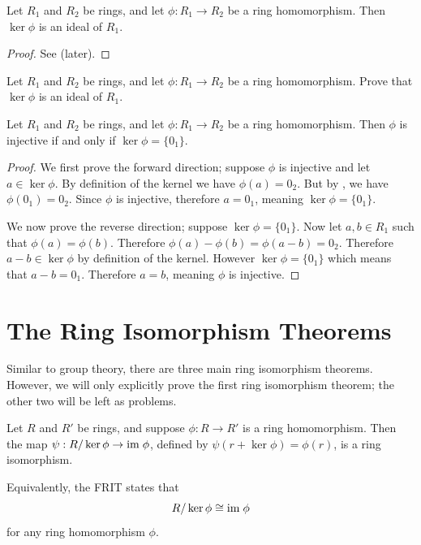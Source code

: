 \begin{proposition}
    Let $R_1$ and $R_2$ be rings, and let $\phi: R_1 \to R_2$ be a ring homomorphism. Then $\ker\phi$ is an ideal of $R_1$.
\end{proposition}
\begin{proof}
    See  (later).
\end{proof}
\begin{exercise}\label{exercise-kernel-is-an-ideal}
    Let $R_1$ and $R_2$ be rings, and let $\phi: R_1 \to R_2$ be a ring homomorphism. Prove that $\ker\phi$ is an ideal of $R_1$.
\end{exercise}

\begin{proposition}
    Let $R_1$ and $R_2$ be rings, and let $\phi: R_1 \to R_2$ be a ring homomorphism. Then $\phi$ is injective if and only if $\ker\phi = \{0_1\}$.
\end{proposition}
\begin{proof}
    We first prove the forward direction; suppose $\phi$ is injective and let $a \in \ker\phi$. By definition of the kernel we have $\phi(a) = 0_2$. But by , we have $\phi(0_1) = 0_2$. Since $\phi$ is injective, therefore $a = 0_1$, meaning $\ker\phi = \{0_1\}$.

    We now prove the reverse direction; suppose $\ker\phi = \{0_1\}$. Now let $a,b \in R_1$ such that $\phi(a) = \phi(b)$. Therefore $\phi(a) - \phi(b) = \phi(a-b) = 0_2$. Therefore $a-b \in \ker\phi$ by definition of the kernel. However $\ker\phi = \{0_1\}$ which means that $a - b = 0_1$. Therefore $a = b$, meaning $\phi$ is injective.
\end{proof}

\section{The Ring Isomorphism Theorems}
Similar to group theory, there are three main ring isomorphism theorems. However, we will only explicitly prove the first ring isomorphism theorem; the other two will be left as problems.

\begin{theorem}\label{thrm-ring-isomorphism-1}
    Let $R$ and $R'$ be rings, and suppose $\phi: R \to R'$ is a ring homomorphism. Then the map $\psi: R / \ker\phi \to \mathrm{im}\;\phi$, defined by $\psi(r + \ker\phi) = \phi(r)$, is a ring isomorphism.
\end{theorem}
\begin{remark}
    Equivalently, the FRIT states that
    \[
        R / \ker\phi \cong \mathrm{im}\;\phi
    \]
    for any ring homomorphism $\phi$.
\end{remark}

